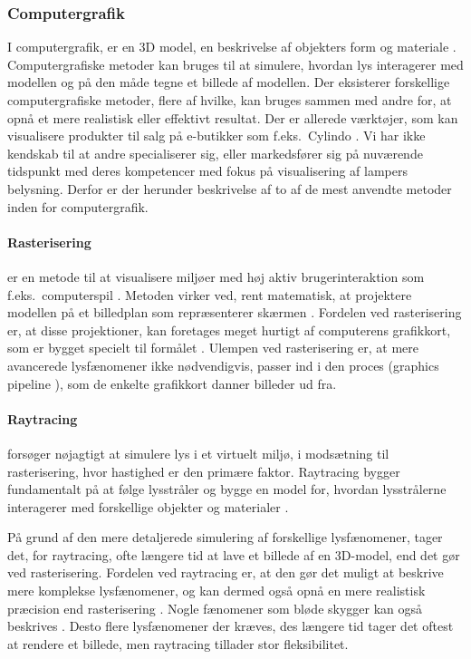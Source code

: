 \subsubsection{Computergrafik}
\label{sec:computergrafik}
I computergrafik, er en 3D model, en beskrivelse af objekters form og materiale \cite{computergrafik_introduktion}. Computergrafiske metoder kan bruges til at simulere, hvordan lys interagerer med modellen og på den måde tegne et billede af modellen. Der eksisterer forskellige computergrafiske metoder, flere af hvilke, kan bruges sammen med andre for, at opnå et mere realistisk eller effektivt resultat. Der er allerede værktøjer, som kan visualisere produkter til salg på e-butikker som f.eks.\ Cylindo \cite{Cylindo}. Vi har ikke kendskab til at andre specialiserer sig, eller markedsfører sig på nuværende tidspunkt med deres kompetencer med fokus på visualisering af lampers belysning. Derfor er der herunder beskrivelse af to af de mest anvendte metoder inden for computergrafik.

\paragraph{Rasterisering}
er en metode til at visualisere miljøer med høj aktiv brugerinteraktion som f.eks.\ computerspil \cite{rastarization}. Metoden virker ved, rent matematisk, at projektere modellen på et billedplan som repræsenterer skærmen \cite{rastarization}. Fordelen ved rasterisering er, at disse projektioner, kan foretages meget hurtigt af computerens grafikkort, som er bygget specielt til formålet \cite{rastarization}. Ulempen ved rasterisering er, at mere avancerede lysfænomener ikke nødvendigvis, passer ind i den proces (graphics pipeline \cite{rastarization}), som de enkelte grafikkort danner billeder ud fra. 

\paragraph{Raytracing} forsøger nøjagtigt at simulere lys i et virtuelt miljø, i modsætning til rasterisering, hvor hastighed er den primære faktor. Raytracing bygger fundamentalt på at følge lysstråler og bygge en model for, hvordan lysstrålerne interagerer med forskellige objekter og materialer \cite{raytracing_for_begyndere}. 

På grund af den mere detaljerede simulering af forskellige lysfænomener, tager det, for raytracing, ofte længere tid at lave et billede af en 3D-model, end det gør ved rasterisering. Fordelen ved raytracing er, at den gør det muligt at beskrive mere komplekse lysfænomener, og kan dermed også opnå en mere realistisk præcision end rasterisering \cite{raytracingvsrastarizatioin}. Nogle fænomener som bløde skygger kan også beskrives \cite{softshadow}. Desto flere lysfænomener der kræves, des længere tid tager det oftest at rendere et billede, men raytracing tillader stor fleksibilitet.